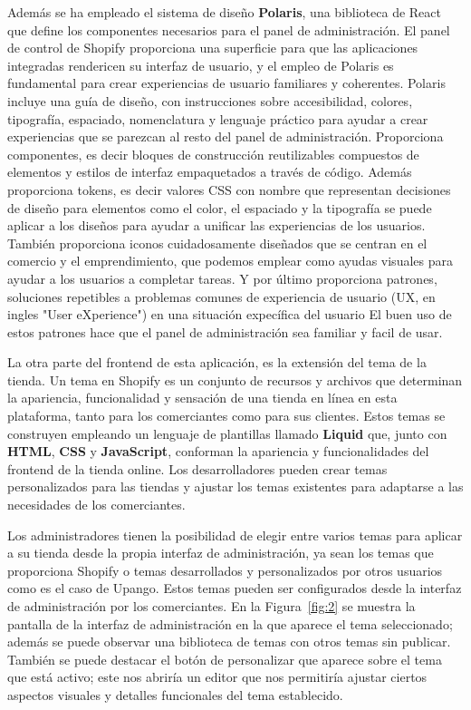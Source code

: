\documentclass[12pt]{article}
\begin{document}
Además se ha empleado el sistema de diseño \textbf{Polaris}, una biblioteca de React que define los componentes necesarios para el panel de administración.
El panel de control de Shopify proporciona una superficie para que las aplicaciones integradas rendericen su interfaz de usuario, y el empleo de Polaris
es fundamental para crear experiencias de usuario familiares y coherentes.
Polaris incluye una guía de diseño, con instrucciones sobre accesibilidad, colores, tipografía, espaciado, nomenclatura y lenguaje práctico para ayudar 
a crear experiencias que se parezcan al resto del panel de administración. Proporciona componentes, es decir bloques de construcción reutilizables compuestos de 
elementos y estilos de interfaz empaquetados a través de código. Además proporciona tokens, es decir valores CSS con nombre que representan decisiones
de diseño para elementos como el color, el espaciado y la tipografía se puede aplicar a los diseños para ayudar a unificar las experiencias de los usuarios.
También proporciona iconos cuidadosamente diseñados que se centran en el comercio y el emprendimiento, que podemos emplear como ayudas visuales para ayudar a los 
usuarios a completar tareas. Y por último proporciona patrones, soluciones repetibles a problemas comunes de experiencia de usuario (UX, en ingles "User eXperience") en una situación expecífica del usuario
El buen uso de estos patrones hace que el panel de administración sea familiar y facil de usar. \cite{shopify-dev}

La otra parte del frontend de esta aplicación, es la extensión del tema de la tienda. Un tema en Shopify es un conjunto de recursos
y archivos que determinan la apariencia, funcionalidad y sensación de una tienda en línea en esta plataforma, tanto para los comerciantes como para
sus clientes. Estos temas se construyen empleando un lenguaje de plantillas llamado \textbf{Liquid} que, junto con \textbf{HTML}, \textbf{CSS} y \textbf{JavaScript}, conforman la apariencia
y funcionalidades del frontend de la tienda online. Los desarrolladores pueden crear temas personalizados para las tiendas y ajustar los temas existentes 
para adaptarse a las necesidades de los comerciantes. \cite{shopify-dev}

Los administradores tienen la posibilidad de elegir entre varios temas para aplicar a su tienda desde la propia interfaz de administración,
ya sean los temas que proporciona Shopify o temas desarrollados y personalizados por otros usuarios como es el caso de Upango. Estos temas pueden ser
configurados desde la interfaz de administración por los comerciantes.
En la Figura~\ref{fig:2} se muestra la pantalla de la interfaz de administración en la que aparece el tema seleccionado; además se puede observar una 
biblioteca de temas con otros temas sin publicar. También se puede destacar el botón de personalizar que aparece
sobre el tema que está activo; este nos abriría un editor que nos permitiría ajustar ciertos aspectos visuales y detalles funcionales del tema establecido.
\end{document}

